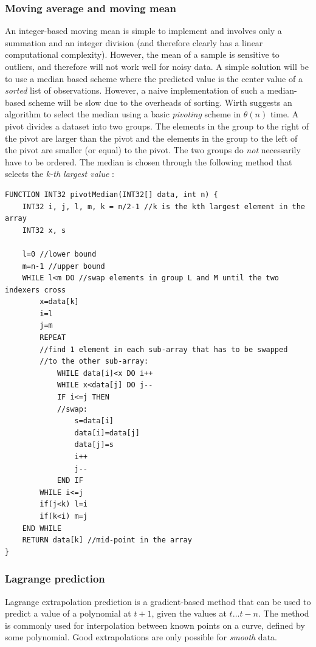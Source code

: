  \subsubsection{Moving average and moving mean}
  An integer-based moving mean is simple to implement and involves only a summation and an integer division (and therefore clearly has a linear computational complexity).
  However, the mean of a sample is sensitive to outliers, and therefore will not work well for noisy data. A simple solution will be to use a median based scheme
  where the predicted value is the center value of a \textit{sorted} list of observations. However, a naive implementation of such a median-based scheme will
  be slow due to the overheads of sorting. Wirth suggests an algorithm \cite{wirth76} to select the median using a basic \textit{pivoting} scheme in $\theta(n)$
  time. A pivot divides a dataset into two groups. The elements in the group to the right of the pivot are larger than the pivot and the elements in the group to
  the left of the pivot are smaller (or equal) to the pivot. The two groups do \emph{not} necessarily have to be ordered. The median is chosen through the following
  method that selects the \textit{k-th largest value} \cite{wirth76}:
  \begin{verbatim}
FUNCTION INT32 pivotMedian(INT32[] data, int n) {
    INT32 i, j, l, m, k = n/2-1 //k is the kth largest element in the array
    INT32 x, s

    l=0 //lower bound
    m=n-1 //upper bound
    WHILE l<m DO //swap elements in group L and M until the two indexers cross
        x=data[k]
        i=l
        j=m
        REPEAT
	    //find 1 element in each sub-array that has to be swapped
	    //to the other sub-array:
            WHILE data[i]<x DO i++
            WHILE x<data[j] DO j--
            IF i<=j THEN
		    //swap:
                s=data[i]
                data[i]=data[j]
                data[j]=s
                i++
                j--
            END IF
        WHILE i<=j
        if(j<k) l=i
        if(k<i) m=j
    END WHILE
    RETURN data[k] //mid-point in the array
}
  \end{verbatim}
 \subsubsection{Lagrange prediction}
  Lagrange extrapolation prediction is a gradient-based method that can be used to predict a value of a polynomial at $t+1$, given the values at $t\dots t-n$.
  The method is commonly used for interpolation between known points on a curve, defined by some polynomial. Good extrapolations are only possible for 
  \textit{smooth} data.
  
